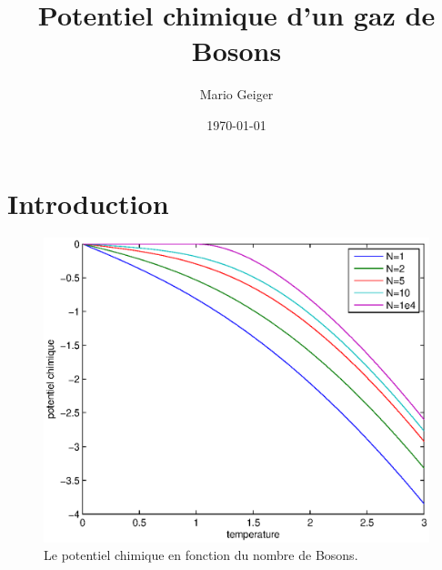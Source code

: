 \documentclass[a4paper,english]{article}
\begin{document}
\title{Potentiel chimique d'un gaz de Bosons}
\author{Mario Geiger}
\date{\today}
\maketitle

\section{Introduction}

\begin{figure}
	\centering
	\includegraphics{untitled.eps}
	\caption{Le potentiel chimique en fonction du nombre de Bosons.}
\end{figure}
\end{document}
